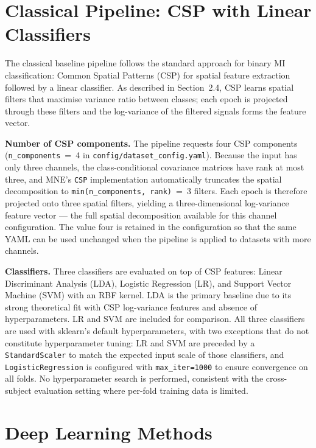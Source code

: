 \documentclass[english, bc, kiv, he, iso690alph, pdf]{fasthesis}
\begin{document}
\section{Classical Pipeline: CSP with Linear Classifiers}
\label{sec:methods_csp}

The classical baseline pipeline follows the standard approach for binary MI classification: Common Spatial Patterns (CSP) for spatial feature extraction followed by a linear classifier. As described in Section~2.4, CSP learns spatial filters that maximise variance ratio between classes; each epoch is projected through these filters and the log-variance of the filtered signals forms the feature vector.

\textbf{Number of CSP components.} The pipeline requests four CSP components (\texttt{n\_components}~=~4 in \texttt{config/dataset\_config.yaml}). Because the input has only three channels, the class-conditional covariance matrices have rank at most three, and MNE's \texttt{CSP} implementation automatically truncates the spatial decomposition to \texttt{min(n\_components, rank)}~=~3 filters. Each epoch is therefore projected onto three spatial filters, yielding a three-dimensional log-variance feature vector — the full spatial decomposition available for this channel configuration. The value four is retained in the configuration so that the same YAML can be used unchanged when the pipeline is applied to datasets with more channels.

\textbf{Classifiers.} Three classifiers are evaluated on top of CSP features: Linear Discriminant Analysis (LDA), Logistic Regression (LR), and Support Vector Machine (SVM) with an RBF kernel. LDA is the primary baseline due to its strong theoretical fit with CSP log-variance features and absence of hyperparameters. LR and SVM are included for comparison. All three classifiers are used with sklearn's default hyperparameters, with two exceptions that do not constitute hyperparameter tuning: LR and SVM are preceded by a \texttt{StandardScaler} to match the expected input scale of those classifiers, and \texttt{LogisticRegression} is configured with \texttt{max\_iter=1000} to ensure convergence on all folds. No hyperparameter search is performed, consistent with the cross-subject evaluation setting where per-fold training data is limited.

\section{Deep Learning Methods}
\end{document}
